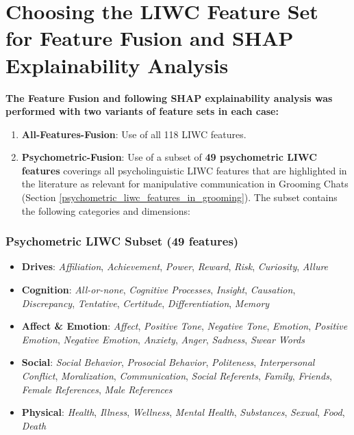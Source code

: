\section{Choosing the LIWC Feature Set for Feature Fusion and SHAP Explainability Analysis} \label{sec:liwc-feature-selection}



\textbf{The Feature Fusion and following SHAP explainability analysis was performed with two variants of feature sets in each case: }
\begin{enumerate}
    \item \textbf{All-Features-Fusion}: Use of all 118 LIWC features.
    \item \textbf{Psychometric-Fusion}: Use of a subset of \textbf{49 psychometric LIWC features} coverings all psycholinguistic LIWC features that are highlighted in the literature as relevant for manipulative communication in Grooming Chats (Section \ref{psychometric_liwc_features_in_grooming}). The subset contains the following categories and dimensions:
\end{enumerate}

\subsubsection{Psychometric LIWC Subset (49 features)}

\begin{itemize}
  \item \textbf{Drives}: \textit{Affiliation}, \textit{Achievement}, \textit{Power}, \textit{Reward}, \textit{Risk}, \textit{Curiosity}, \textit{Allure}
  \item \textbf{Cognition}: \textit{All-or-none}, \textit{Cognitive Processes}, \textit{Insight}, \textit{Causation}, \textit{Discrepancy}, \textit{Tentative}, \textit{Certitude}, \textit{Differentiation}, \textit{Memory}
  \item \textbf{Affect \& Emotion}: \textit{Affect}, \textit{Positive Tone}, \textit{Negative Tone}, \textit{Emotion}, \textit{Positive Emotion}, \textit{Negative Emotion}, \textit{Anxiety}, \textit{Anger}, \textit{Sadness}, \textit{Swear Words}
  \item \textbf{Social}: \textit{Social Behavior}, \textit{Prosocial Behavior}, \textit{Politeness}, \textit{Interpersonal Conflict}, \textit{Moralization}, \textit{Communication}, \textit{Social Referents}, \textit{Family}, \textit{Friends}, \textit{Female References}, \textit{Male References}
  \item \textbf{Physical}: \textit{Health}, \textit{Illness}, \textit{Wellness}, \textit{Mental Health}, \textit{Substances}, \textit{Sexual}, \textit{Food}, \textit{Death}
\end{itemize}



